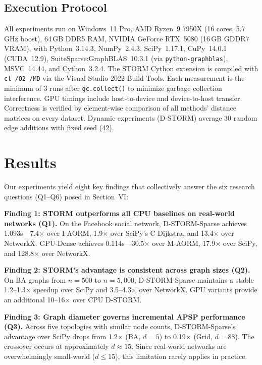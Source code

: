 \documentclass[journal]{IEEEtran}
\begin{document}
\subsection{Execution Protocol}

All experiments run on Windows~11 Pro, AMD Ryzen~9 7950X (16 cores, 5.7\,GHz boost), 64\,GB DDR5 RAM, NVIDIA GeForce RTX~5080 (16\,GB GDDR7 VRAM), with Python~3.14.3, NumPy~2.4.3, SciPy~1.17.1, CuPy~14.0.1 (CUDA~12.9), SuiteSparse:GraphBLAS~10.3.1 (via \texttt{python-graphblas}), MSVC~14.44, and Cython~3.2.4. The STORM Cython extension is compiled with \texttt{cl /O2 /MD} via the Visual Studio 2022 Build Tools. Each measurement is the minimum of 3 runs after \texttt{gc.collect()} to minimize garbage collection interference. GPU timings include host-to-device and device-to-host transfer. Correctness is verified by element-wise comparison of all methods' distance matrices on every dataset. Dynamic experiments (D-STORM) average 30 random edge additions with fixed seed (42).


\section{Results}
\label{sec:results}

Our experiments yield eight key findings that collectively answer the six research questions (Q1--Q6) posed in Section~VI:

\textbf{Finding 1: STORM outperforms all CPU baselines on real-world networks (Q1).} On the Facebook social network, D-STORM-Sparse achieves 1.093s---7.4$\times$ over I-AORM, 1.9$\times$ over SciPy's C Dijkstra, and 13.4$\times$ over NetworkX. GPU-Dense achieves 0.114s---30.5$\times$ over M-AORM, 17.9$\times$ over SciPy, and 128.8$\times$ over NetworkX.

\textbf{Finding 2: STORM's advantage is consistent across graph sizes (Q2).} On BA graphs from $n=500$ to $n=5{,}000$, D-STORM-Sparse maintains a stable 1.2--1.3$\times$ speedup over SciPy and 3.5--4.3$\times$ over NetworkX. GPU variants provide an additional 10--16$\times$ over CPU D-STORM.

\textbf{Finding 3: Graph diameter governs incremental APSP performance (Q3).} Across five topologies with similar node counts, D-STORM-Sparse's advantage over SciPy drops from 1.2$\times$ (BA, $d=5$) to 0.19$\times$ (Grid, $d=88$). The crossover occurs at approximately $d \approx 15$. Since real-world networks are overwhelmingly small-world ($d \leq 15$), this limitation rarely applies in practice.
\end{document}
